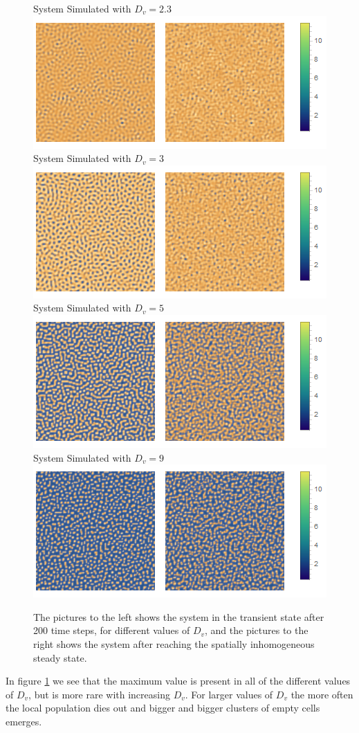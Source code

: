 \begin{figure}[h]
\centering
System Simulated with $D_v=2.3$\\
\includegraphics[scale=0.5]{img/2bd23Comb.png}\\
System Simulated with $D_v=3$\\
\includegraphics[scale=0.5]{img/2bd3Comb.png}\\
System Simulated with $D_v=5$\\
\includegraphics[scale=0.5]{img/2bd5Comb.png}\\
System Simulated with $D_v=9$\\
\includegraphics[scale=0.5]{img/2bd9Comb.png}\\
\caption{\label{fig:pic2b} The pictures to the left shows the system in the transient state after 200 time steps, for different values of $D_v$, and the pictures to the right shows the system after reaching the spatially inhomogeneous steady state.}
\end{figure}

In figure \ref{fig:pic2b} we see that the maximum value is present in all of the different values of $D_v$, but is more rare with increasing $D_v$. For larger values of $D_v$ the more often the local population dies out and bigger and bigger clusters of empty cells emerges.
